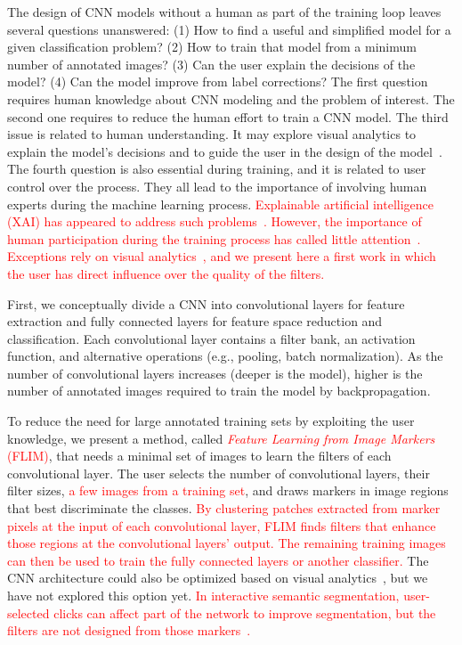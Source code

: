 \documentclass[journal, twoside]{IEEEtran}
\begin{document}
The design of CNN models without a human as part of the training loop leaves several questions unanswered: (1) How to find a useful and simplified model for a given classification problem? (2) How to train that model from a minimum number of annotated images?  (3) Can the user explain the decisions of the model? (4) Can the model improve from label corrections? The first question requires human knowledge about CNN modeling and the problem of interest. The second one requires to reduce the human effort to train a CNN model. The third issue is related to human understanding. It may explore visual analytics to explain the model's decisions and to guide the user in the design of the model~\cite{RauberInfoVis2018,GarciaIJCNN2019,SpinnerTVCG2020}. The fourth question is also essential during training, and it is related to user control over the process. They all lead to the importance of involving human experts during the machine learning process. \textcolor{red}{Explainable artificial intelligence (XAI) has appeared to address such problems~\cite{rauber2016visualizing,arrietaInfoFusion2020}. However, the importance of human participation during the training process has called little attention~\cite{AngelovNN2020}. Exceptions rely on visual analytics~\cite{RauberInfoVis2018,GarciaIJCNN2019,SpinnerTVCG2020}, and we present here a first work in which the user has direct influence over the quality of the filters.}

First, we conceptually divide a CNN into convolutional layers for feature extraction and fully connected layers for feature space reduction and classification. Each convolutional layer contains a filter bank, an activation function, and alternative operations (e.g., pooling, batch normalization).  As the number of convolutional layers increases (deeper is the model), higher is the number of annotated images required to train the model by backpropagation. 

To reduce the need for large annotated training sets by exploiting the user knowledge, we present a method, called \textcolor{red}{\emph{Feature Learning from Image Markers} (FLIM)}, that needs a minimal set of images to learn the filters of each convolutional layer. The user selects the number of convolutional layers, their filter sizes, \textcolor{red}{a few images from a training set}, and draws markers in image regions that best discriminate the classes. \textcolor{red}{By clustering patches extracted from marker pixels at the input of each convolutional layer, FLIM finds filters that enhance those regions at the convolutional layers' output. The remaining training images can then be used to train the fully connected layers or another classifier.} The CNN architecture could also be optimized based on visual analytics~\cite{SpinnerTVCG2020}, but we have not explored this option yet. \textcolor{red}{In interactive semantic segmentation, user-selected clicks can affect part of the network to improve segmentation, but the filters are not designed from those markers~\cite{SofiiukCVPR2020}.}
\end{document}
